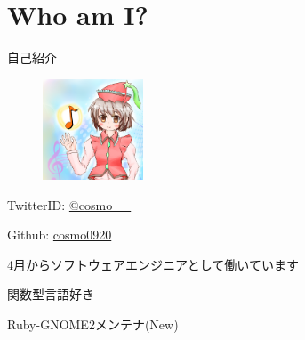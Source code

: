 \section{Who am I?}

\begin{frame}
\begin{block}{自己紹介}
{\Large
\begin{figure}
\begin{center}
\includegraphics[width=3cm]{img/icon.png}
\end{center}
\end{figure}

TwitterID: \href{https://twitter.com/cosmo\_\_}{@cosmo\_\_ }

Github: \href{https://github.com/cosmo0920}{cosmo0920 }

4月からソフトウェアエンジニアとして働いています

関数型言語好き

Ruby-GNOME2メンテナ(New)

}
\end{block}
\end{frame}
